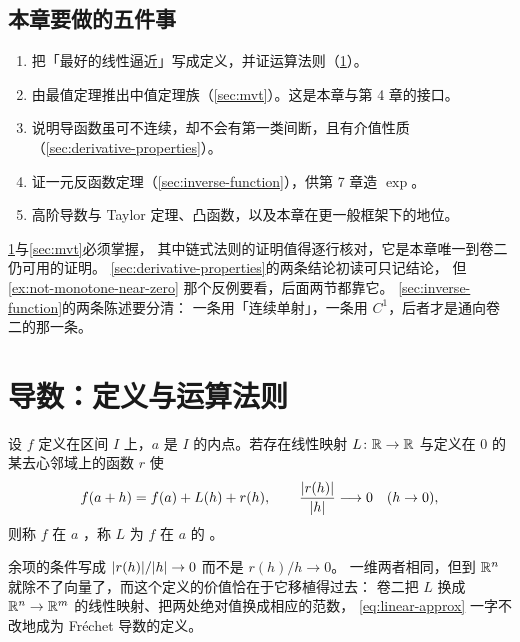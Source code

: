 \subsection*{本章要做的五件事}

\begin{enumerate}[label=(\arabic*), leftmargin=1.8em]
  \item 把「最好的线性逼近」写成定义，并证运算法则（\cref{sec:derivative-rules}）。
  \item 由最值定理推出中值定理族（\cref{sec:mvt}）。这是本章与第 4 章的接口。
  \item 说明导函数虽可不连续，却不会有第一类间断，且有介值性质
        （\cref{sec:derivative-properties}）。
  \item 证一元反函数定理（\cref{sec:inverse-function}），供第 7 章造 \(\exp\)。
  \item 高阶导数与 Taylor 定理、凸函数，以及本章在更一般框架下的地位。
\end{enumerate}

\begin{remark}[读法建议]
  \cref{sec:derivative-rules}与\cref{sec:mvt}必须掌握，
  其中链式法则的证明值得逐行核对，它是本章唯一到卷二仍可用的证明。
  \cref{sec:derivative-properties}的两条结论初读可只记结论，
  但\cref{ex:not-monotone-near-zero} 那个反例要看，后面两节都靠它。
  \cref{sec:inverse-function}的两条陈述要分清：
  一条用「连续单射」，一条用 \(C^{1}\)，后者才是通向卷二的那一条。
\end{remark}

\section{导数：定义与运算法则}
\label{sec:derivative-rules}

\begin{definition}[可微与导数]
  \label{def:differentiable}
  设 \(f\) 定义在区间 \(I\) 上，\(a\) 是 \(I\) 的内点。若存在线性映射
  \(L \colon \mathbb{R} \to \mathbb{R}\) 与定义在 \(0\) 的某去心邻域上的函数 \(r\) 使
  \begin{equation}
    \label{eq:linear-approx}
    f(a+h) = f(a) + L(h) + r(h), \qquad
    \frac{\lvert r(h)\rvert}{\lvert h\rvert} \longrightarrow 0 \quad (h \to 0),
  \end{equation}
  则称 \(f\) 在 \(a\) ，称 \(L\) 为 \(f\) 在 \(a\) 的%
  。
\end{definition}

\begin{remark}
  余项的条件写成 \(\lvert r(h)\rvert/\lvert h\rvert \to 0\) 而不是 \(r(h)/h \to 0\)。
  一维两者相同，但到 \(\mathbb{R}^{n}\) 就除不了向量了，而这个定义的价值恰在于它移植得过去：
  卷二把 \(L\) 换成 \(\mathbb{R}^{n} \to \mathbb{R}^{m}\) 的线性映射、把两处绝对值换成相应的范数，
  \cref{eq:linear-approx} 一字不改地成为 Fréchet 导数的定义。
\end{remark}

